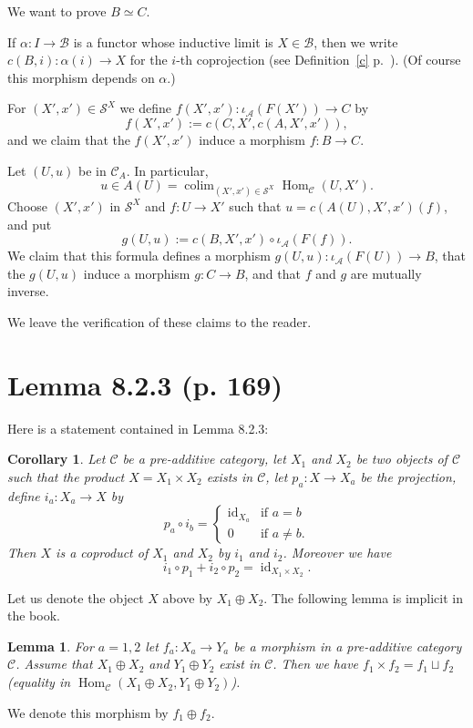 \documentclass[12pt]{article}
\newtheorem{lem}[thm]{Lemma}
\newtheorem{cor}[thm]{Corollary}
\theoremstyle{remark}
\theoremstyle{definition}
\newcommand{\A}{\mathcal A}
\newcommand{\B}{\mathcal B}
\newcommand{\C}{\mathcal C}
\newcommand{\SSS}{\mathcal S}
\DeclareMathOperator*{\co}{colim}
\DeclareMathOperator{\id}{id}
\DeclareMathOperator{\Hom}{Hom}%
\begin{document}
We want to prove $B\simeq C$.

 If $\alpha:I\to\B$ is a functor whose inductive limit is $X\in\B$, then we write $c(B,i):\alpha(i)\to X$ for the $i$-th coprojection (see Definition~\ref{c} p.~\pageref{c}). (Of course this morphism depends on $\alpha$.) 

For $(X',x')\in\SSS^X$ we define $f(X',x'):\iota_\A(F(X'))\to C$ by 
$$
f(X',x'):=c(C,X',c(A,X',x')),
$$ 
and we claim that the $f(X',x')$ induce a morphism $f:B\to C$. 

Let $(U,u)$ be in $\C_A$. In particular, 
$$
u\in A(U)=\co_{(X',x')\in\SSS^X}\Hom_\C(U,X').
$$ 
Choose $(X',x')$ in $\SSS^X$ and $f:U\to X'$ such that $u=c(A(U),X',x')(f)$, and put 
$$
g(U,u):=c(B,X',x')\circ\iota_\A(F(f)).
$$ 
We claim that this formula defines a morphism $g(U,u):\iota_\A(F(U))\to B$, that the $g(U,u)$ induce a morphism $g:C\to B$, and that $f$ and $g$ are mutually inverse. 

We leave the verification of these claims to the reader. 
%
\section{Lemma 8.2.3 (p. 169)}%
%
Here is a statement contained in Lemma 8.2.3:
%
\begin{cor}\label{823}
Let $\C$ be a pre-additive category, let $X_1$ and $X_2$ be two objects of $\C$ such that the product $X=X_1\times X_2$ exists in $\C$, let $p_a:X\to X_a$ be the projection, define $i_a:X_a\to X$ by 
$$
p_a\circ i_b=\begin{cases}\id_{X_a}&\text{if }a=b\\0&\text{if }a\not=b.\end{cases}
$$ 
Then $X$ is a coproduct of $X_1$ and $X_2$ by $i_1$ and $i_2$. Moreover we have 
$$
i_1\circ p_1+i_2\circ p_2=\id_{X_1\times X_2}.
$$
\end{cor}

Let us denote the object $X$ above by $X_1\oplus X_2$. The following lemma is implicit in the book. 

\begin{lem}
For $a=1,2$ let $f_a:X_a\to Y_a$ be a morphism in a pre-additive category $\C$. Assume that $X_1\oplus X_2$ and $Y_1\oplus Y_2$ exist in $\C$. Then we have $f_1\times f_2=f_1\sqcup f_2$ (equality in $\Hom_\C(X_1\oplus X_2,Y_1\oplus Y_2)$). 
\end{lem} 

We denote this morphism by $f_1\oplus f_2$.\medskip 
\end{document}
